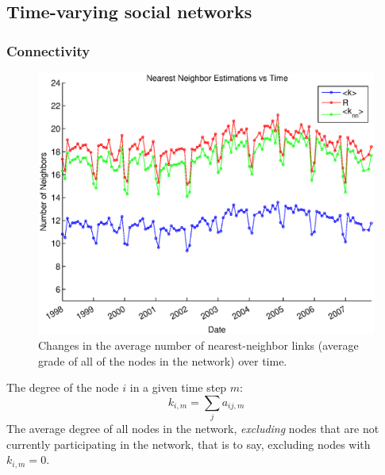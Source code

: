 \documentclass[12pt]{article}
\begin{document}
\subsection{Time-varying social networks}

\subsubsection{Connectivity}%

%
%

\begin{figure}[H]
\includegraphics[width = .8\textwidth]{Graficos/NearestNeighbors.eps}
\caption{Changes in the average number of nearest-neighbor links (average grade of all of the nodes in the network) over time.}
\label{fig:NearestNeighbors}
\end{figure}

The degree of the node \(i\) in a given time step \(m\):
\begin{equation}
k_{i,m} = \sum_j a_{ij,m}
\end{equation}
The average degree of all nodes in the network, \emph{excluding} nodes that are not currently participating in the network, that is to say, excluding nodes with \(k_{i,m} = 0\).
\end{document}
